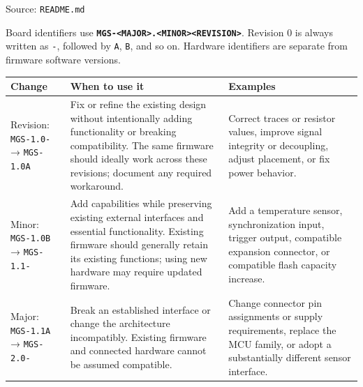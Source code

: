 \documentclass[10pt,a4paper,oneside]{report}
\begin{document}
{\small\color{MGSMuted}Source: \nolinkurl{README.md}\par}\medskip

Board identifiers use \textbf{\texttt{MGS-\allowbreak{}<MAJOR>.\allowbreak{}<MINOR><REVISION>}}. Revision 0 is always written as \texttt{-\allowbreak{}}, followed by \texttt{A}, \texttt{B}, and so on. Hardware identifiers are separate from firmware software versions.

{\def\LTcaptype{none} %
\begin{longtable}[]{@{}
  >{\raggedright\arraybackslash}p{}
  >{\raggedright\arraybackslash}p{}
  >{\raggedright\arraybackslash}p{}@{}}
\toprule\noalign{}
\begin{minipage}[b]{\linewidth}\raggedright
\textbf{Change}
\end{minipage} & \begin{minipage}[b]{\linewidth}\raggedright
\textbf{When to use it}
\end{minipage} & \begin{minipage}[b]{\linewidth}\raggedright
\textbf{Examples}
\end{minipage} \\
\midrule\noalign{}
\endhead
\bottomrule\noalign{}
\endlastfoot
Revision: \texttt{MGS-\allowbreak{}1.\allowbreak{}0-\allowbreak{}} → \texttt{MGS-\allowbreak{}1.\allowbreak{}0A} & Fix or refine the existing design without intentionally adding functionality or breaking compatibility. The same firmware should ideally work across these revisions; document any required workaround. & Correct traces or resistor values, improve signal integrity or decoupling, adjust placement, or fix power behavior. \\
Minor: \texttt{MGS-\allowbreak{}1.\allowbreak{}0B} → \texttt{MGS-\allowbreak{}1.\allowbreak{}1-\allowbreak{}} & Add capabilities while preserving existing external interfaces and essential functionality. Existing firmware should generally retain its existing functions; using new hardware may require updated firmware. & Add a temperature sensor, synchronization input, trigger output, compatible expansion connector, or compatible flash capacity increase. \\
Major: \texttt{MGS-\allowbreak{}1.\allowbreak{}1A} → \texttt{MGS-\allowbreak{}2.\allowbreak{}0-\allowbreak{}} & Break an established interface or change the architecture incompatibly. Existing firmware and connected hardware cannot be assumed compatible. & Change connector pin assignments or supply requirements, replace the MCU family, or adopt a substantially different sensor interface. \\
\end{longtable}
}
\end{document}
